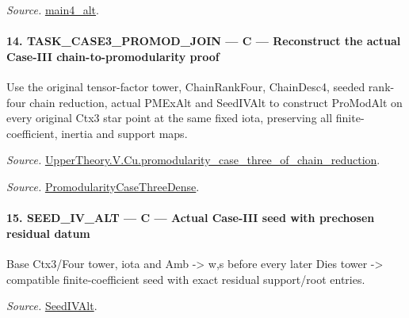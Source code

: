 \documentclass[11pt,a4paper]{article}
\numberwithin{equation}{section}
\theoremstyle{remark}\newtheorem{remark}[theorem]{Remark}
\begin{document}
\emph{Source.} \href{https://github.com/CocoSgt/riemann-hypothesis-lean/blob/7cbf7a0c32fca1badf05931879a37c3f8a2b03b4/src/Development/AutomorphicArithmetic/AutomorphicVarieties/ModularityArgument/ThresholdArguments/DenseThresholdCases/CuFinal.lean#L44-L44}{main4\_\allowbreak alt}.



\paragraph{14. TASK\_\allowbreak CASE3\_\allowbreak PROMOD\_\allowbreak JOIN — C — Reconstruct the actual Case-III chain-to-promodularity proof}

Use the original tensor-factor tower, ChainRankFour, ChainDesc4, seeded rank-four chain reduction, actual PMExAlt and SeedIVAlt to construct ProModAlt on every original Ctx3 star point at the same fixed iota, preserving all finite-coefficient, inertia and support maps.

\emph{Source.} \href{https://github.com/CocoSgt/riemann-hypothesis-lean/blob/7cbf7a0c32fca1badf05931879a37c3f8a2b03b4/src/Development/AutomorphicArithmetic/AutomorphicVarieties/ModularityArgument/ThresholdArguments/DenseThresholdCases/PromodularityCaseThreeOfLemmas.lean#L131-L153}{UpperTheory.V.Cu.promodularity\_\allowbreak case\_\allowbreak three\_\allowbreak of\_\allowbreak chain\_\allowbreak reduction}.

\emph{Source.} \href{https://github.com/CocoSgt/riemann-hypothesis-lean/blob/7cbf7a0c32fca1badf05931879a37c3f8a2b03b4/src/Development/AutomorphicArithmetic/AutomorphicVarieties/ModularityArgument/ThresholdArguments/DenseThresholdCases/PromodularityCaseThree.lean#L40-L42}{PromodularityCaseThreeDense}.



\paragraph{15. SEED\_\allowbreak IV\_\allowbreak ALT — C — Actual Case-III seed with prechosen residual datum}

Base Ctx3/Four tower, iota and Amb -> w,s before every later Dies tower -> compatible finite-coefficient seed with exact residual support/root entries.

\emph{Source.} \href{https://github.com/CocoSgt/riemann-hypothesis-lean/blob/7cbf7a0c32fca1badf05931879a37c3f8a2b03b4/src/Development/AutomorphicArithmetic/AutomorphicVarieties/ModularityArgument/ThresholdArguments/DenseThresholdCases/PromodularityCaseThree.lean#L19-L25}{SeedIVAlt}.
\end{document}
